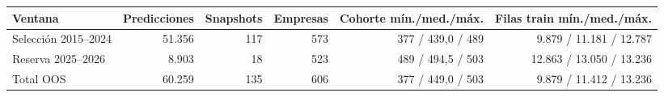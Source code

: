 \begin{tabular}{lrrrrr}
\toprule
Ventana & Predicciones & Snapshots & Empresas & Cohorte mín./med./máx. & Filas train mín./med./máx. \\
\midrule
Selección 2015--2024 & 51.356 & 117 & 573 & 377 / 439,0 / 489 & 9.879 / 11.181 / 12.787 \\
Reserva 2025--2026 & 8.903 & 18 & 523 & 489 / 494,5 / 503 & 12.863 / 13.050 / 13.236 \\
Total OOS & 60.259 & 135 & 606 & 377 / 449,0 / 503 & 9.879 / 11.412 / 13.236 \\
\bottomrule
\end{tabular}
